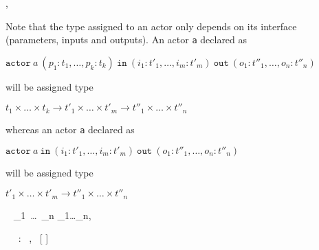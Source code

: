 {\TE,\VE~ \vdash
  \actorr~~~~~~
  }

Note that the type assigned to an actor only depends on its interface (parameters, inputs and outputs).
An actor \texttt{a} declared as

\medskip
$\mathtt{actor}~a~(p_1:t_1,\ldots,p_k:t_k)~\mathtt{in}~(i_1:t'_1,\ldots,i_m:t'_m)~\mathtt{out}~(o_1:t''_1,\ldots,o_n:t''_n)$

\medskip
will be assigned type

\medskip
$t_1\times\ldots\times t_k \rightarrow t'_1\times\ldots\times t'_m \rightarrow t''_1\times\ldots\times t''_n$

\medskip
whereas an actor \texttt{a} declared as

\medskip
$\mathtt{actor}~a~\mathtt{in}~(i_1:t'_1,\ldots,i_m:t'_m)~\mathtt{out}~(o_1:t''_1,\ldots,o_n:t''_n)$

\medskip
will be assigned type

\medskip
$t'_1\times\ldots\times t'_m \rightarrow t''_1\times\ldots\times t''_n$

\medskip


{\TE~ \vdash {}_1~\ldots~_n \gives \tau_1\times\ldots\times\tau_n,~ }

\infrule[ActParam]
{\TE~\vdash \ty \gives \tau}
{\TE~\vdash {} ~:~ \ty \gives \tau,~ [ \mapsto \tau]}


